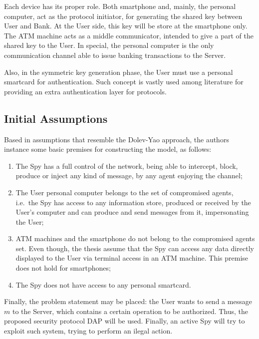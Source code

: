 Each device has its proper role. Both smartphone and, mainly, the personal computer, act as the protocol initiator, for generating the shared key between User and Bank. At the User side, this key will be store at the smartphone only. The ATM machine acts as a middle communicator, intended to give a part of the shared key to the User. In special, the personal computer is the only communication channel able to issue banking transactions to the Server.

Also, in the symmetric key generation phase, the User must use a personal smartcard for authentication. Such concept is vastly used among literature \cite{ShoupRubin96} for providing an extra authentication layer for protocols.






\subsection{Initial Assumptions}
Based in assumptions that resemble the Dolev-Yao approach, the authors instance some basic premises for constructing the model, as follows:

\begin{enumerate}
  \item The Spy has a full control of the network, being able to intercept, block, produce or inject any kind of message, by any agent enjoying the channel;

  \item The User personal computer belongs to the set of compromised agents, i.e.\ the Spy has access to any information store, produced or received by the User's computer and can produce and send messages from it, impersonating the User;

  \item ATM machines and the smartphone do not belong to the compromised agents set. Even though, the thesis assume that the Spy can access any data directly displayed to the User via terminal access in an ATM machine. This premise does not hold for smartphones;

  \item The Spy does not have access to any personal smartcard.
\end{enumerate}

Finally, the problem statement may be placed: the User wants to send a message $m$ to the Server, which contains a certain operation to be authorized. Thus, the proposed security protocol DAP will be used. Finally, an active Spy will try to exploit such system, trying to perform an ilegal action.






